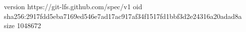 version https://git-lfs.github.com/spec/v1
oid sha256:2917fdd5eba7169ed546e7ad17ac917af34f1517fd1bbf3d2e24316a20adad8a
size 1048672
